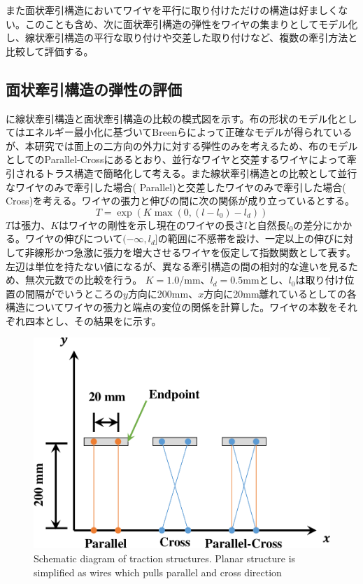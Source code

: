 \documentclass{jarticle}
\begin{document}
また面状牽引構造においてワイヤを平行に取り付けただけの構造は好ましくない。このことも含め、次に面状牽引構造の弾性をワイヤの集まりとしてモデル化し、線状牽引構造の平行な取り付けや交差した取り付けなど、複数の牽引方法と比較して評価する。

\subsection{面状牽引構造の弾性の評価}\label{sec:hoge}
に線状牽引構造と面状牽引構造の比較の模式図を示す。布の形状のモデル化としてはエネルギー最小化に基づいてBreen\cite{Breen:1994}らによって正確なモデルが得られているが、本研究では面上の二方向の外力に対する弾性のみを考えるため、布のモデルとしてのParallel-Crossにあるとおり、並行なワイヤと交差するワイヤによって牽引されるトラス構造で簡略化して考える。また線状牽引構造との比較として並行なワイヤのみで牽引した場合( Parallel)と交差したワイヤのみで牽引した場合( Cross)を考える。ワイヤの張力と伸びの間に次の関係が成り立っているとする。
\begin{equation}
  T = \exp(K\max(0,(l-l_0) - l_d))
\end{equation}
${T}$は張力、${K}$はワイヤの剛性を示し現在のワイヤの長さ${l}$と自然長${l_0}$の差分にかかる。ワイヤの伸びについて$(-\infty,l_d]$の範囲に不感帯を設け、一定以上の伸びに対して非線形かつ急激に張力を増大させるワイヤを仮定して指数関数として表す。左辺は単位を持たない値になるが、異なる牽引構造の間の相対的な違いを見るため、無次元数での比較を行う。
${K=1.0}$/mm、${l_d=0.5}$mmとし、${l_0}$は取り付け位置の間隔がでいうところの${y}$方向に200mm、${x}$方向に20mm離れているとしての各構造についてワイヤの張力と端点の変位の関係を計算した。ワイヤの本数をそれぞれ四本とし、その結果をに示す。

\begin{figure}[tb]
 \centering
  \includegraphics[width=0.7\columnwidth]{figs/schematic-comparison-of-ligaments.pdf}
  \vspace*{-4mm}
  \caption{Schematic diagram of traction structures. Planar structure is simplified as wires which pulls parallel and cross direction}
  \label{fig:comparison}
\end{figure}
\end{document}
